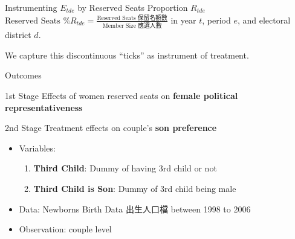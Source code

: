 \documentclass[
  9pt,
  ignorenonframetext,
  aspectratio=43,
]{beamer}
\providecommand{\tightlist}{%
  \setlength{\itemsep}{0pt}\setlength{\parskip}{0pt}}
\begin{document}
\begin{frame}{Instrumenting \(E_{tde}\) by Reserved Seats Proportion
\(R_{tde}\)}
\protect\hypertarget{instrumenting-e_tde-by-reserved-seats-proportion-r_tde}{}
\(\text{Reserved Seats \% } R_{tde} = \frac{\text{Reserved Seats 保留名額數}}{\text{Member Size 應選人數}}\)
in year \(t\), period \(e\), and electoral district \(d\).

\begin{figure}[htb]
\centering
{}
\end{figure}

We capture this discontinuous ``ticks'' as instrument of treatment.
\end{frame}

\begin{frame}{Outcomes}
\protect\hypertarget{outcomes}{}
\begin{block}{1st Stage}
\protect\hypertarget{st-stage}{}
Effects of women reserved seats on \textbf{female political
representativeness}
\end{block}

\begin{block}{2nd Stage}
\protect\hypertarget{nd-stage}{}
Treatment effects on couple's \textbf{son preference}

\begin{itemize}
\tightlist
\item
  Variables:

  \begin{enumerate}
  \tightlist
  \item
    \textbf{Third Child}: Dummy of having 3rd child or not
  \item
    \textbf{Third Child is Son}: Dummy of 3rd child being male
  \end{enumerate}
\item
  Data: Newborns Birth Data 出生人口檔 between 1998 to 2006
\item
  Observation: couple level
\end{itemize}
\end{block}
\end{frame}
\end{document}
